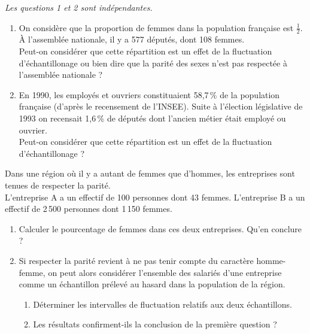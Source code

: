 \begin{exo}
\emph{Les questions 1 et 2 sont ind\'ependantes.}
\begin{enumerate}
 \item On consid\`ere que la proportion de femmes dans la population fran\c caise est $\frac{1}{2}$. \`A l'assembl\'ee nationale, il y a 577 d\'eput\'es, dont 108 femmes.\\
 Peut-on consid\'erer que cette r\'epartition est un effet de la fluctuation d'\'echantillonage ou bien dire que la parit\'e des sexes n'est pas respect\'ee \`a l'assembl\'ee nationale ?
 \item En 1990, les employ\'es et ouvriers constituaient 58,7\,\% de la population fran\c caise (d'apr\`es le recensement de l'INSEE). Suite \`a l'\'election l\'egislative de 1993 on recensait 1,6\,\% de d\'eput\'es dont l'ancien m\'etier \'etait employ\'e ou ouvrier.\\
 Peut-on consid\'erer que cette r\'epartition est un effet de la fluctuation d'\'echantillonage ?
\end{enumerate}

 
\end{exo}



\begin{exo}
 Dans une r\'egion o\`u il y a autant de femmes que d'hommes, les entreprises sont tenues de respecter la parit\'e.\\
 L'entreprise A a un effectif de 100 personnes dont 43 femmes. L'entreprise B a un effectif de 2\,500 personnes dont 1\,150 femmes.
\begin{enumerate}
 \item Calculer le pourcentage de femmes dans ces deux entreprises. Qu'en conclure ?
 \item Si respecter la parit\'e revient \`a ne pas tenir compte du caract\`ere homme-femme, on peut alors consid\'erer l'ensemble des salari\'es d'une entreprise comme un \'echantillon pr\'elev\'e au hasard dans la population de la r\'egion.
    \begin{enumerate}
     \item D\'eterminer les intervalles de fluctuation relatifs aux deux \'echantillons.
     \item Les r\'esultats confirment-ils la conclusion de la premi\`ere question ?
    \end{enumerate}


\end{enumerate}

\end{exo}





